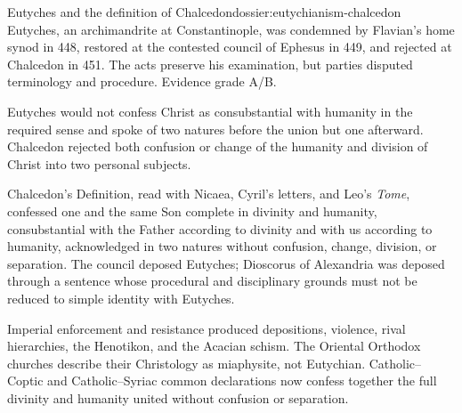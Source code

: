 \begin{heresydossier}{Eutyches and the definition of Chalcedon}{dossier:eutychianism-chalcedon}
\objectfield Eutyches, an archimandrite at Constantinople, was condemned by Flavian's home synod in 448, restored at the contested council of Ephesus in 449, and rejected at Chalcedon in 451. The acts preserve his examination, but parties disputed terminology and procedure. Evidence grade A/B.

\propositionfield Eutyches would not confess Christ as consubstantial with humanity in the required sense and spoke of two natures before the union but one afterward. Chalcedon rejected both confusion or change of the humanity and division of Christ into two personal subjects.

\responsefield Chalcedon's Definition, read with Nicaea, Cyril's letters, and Leo's \emph{Tome}, confessed one and the same Son complete in divinity and humanity, consubstantial with the Father according to divinity and with us according to humanity, acknowledged in two natures without confusion, change, division, or separation. The council deposed Eutyches; Dioscorus of Alexandria was deposed through a sentence whose procedural and disciplinary grounds must not be reduced to simple identity with Eutyches.

\aftermathfield Imperial enforcement and resistance produced depositions, violence, rival hierarchies, the Henotikon, and the Acacian schism. The Oriental Orthodox churches describe their Christology as miaphysite, not Eutychian. Catholic--Coptic and Catholic--Syriac common declarations now confess together the full divinity and humanity united without confusion or separation.
\end{heresydossier}

